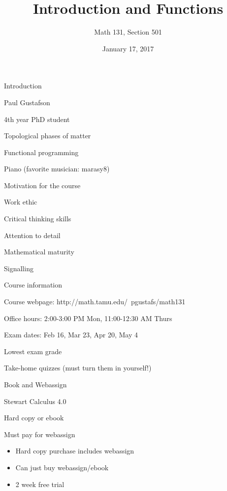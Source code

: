 \documentclass[t]{beamer}
\title{Introduction and Functions}
\author{Math 131, Section 501}
\date{January 17, 2017}
\newenvironment{fpi}
  {\itemize[nolistsep,itemsep=\fill]}
  {\vfill\enditemize}
\begin{document}
\frame{\titlepage}


\begin{frame}{Introduction}
\begin{fpi}
\item Paul Gustafson
\item 4th year PhD student
\item Topological phases of matter 
\item Functional programming
\item Piano (favorite musician: marasy8)
\end{fpi}
\end{frame}

\begin{frame}{Motivation for the course}
\begin{fpi}
\item Work ethic
\item Critical thinking skills
\item Attention to detail
\item Mathematical maturity 
\item Signalling 
\end{fpi}
\end{frame}

\begin{frame}{Course information}
\begin{fpi}
\item Course webpage: http://math.tamu.edu/~pgustafs/math131
\item Office hours: 2:00-3:00 PM Mon, 11:00-12:30 AM Thurs 
\item Exam dates: Feb 16, Mar 23, Apr 20, May 4
\item Lowest exam grade
\item Take-home quizzes (must turn them in yourself!)
\end{fpi}
\end{frame}

\begin{frame}{Book and Webassign}
\begin{fpi}
\item Stewart Calculus 4.0
\item Hard copy or ebook
\item Must pay for webassign
\begin{itemize}
\item Hard copy purchase includes webassign
\item Can just buy webassign/ebook
\item 2 week free trial 
\end{itemize}
\end{fpi}
\end{frame}
\end{document}

